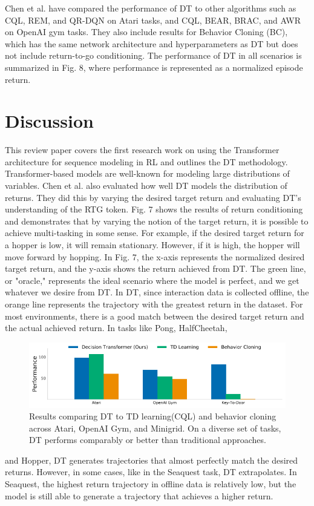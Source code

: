 \documentclass[conference]{IEEEtran}
\begin{document}
Chen et al.\cite{b1} have compared the performance of DT to other algorithms such as CQL\cite{b18}, REM\cite{b16}, and QR-DQN\cite{b19} on Atari tasks, and CQL\cite{b18}, BEAR\cite{b20}, BRAC\cite{b21}, and AWR\cite{b22} on OpenAI gym tasks. They also include results for Behavior Cloning (BC), which has the same network architecture and hyperparameters as DT but does not include return-to-go conditioning. The performance of DT in all scenarios is summarized in Fig. 8, where performance is represented as a normalized episode return.


\section{Discussion}
This review paper covers the first research work on using the Transformer architecture for sequence modeling in RL and outlines the DT methodology. Transformer-based models are well-known for modeling large distributions of variables. Chen et al.\cite{b1} also evaluated how well DT models the distribution of returns. They did this by varying the desired target return and evaluating DT's understanding of the RTG token. Fig. 7 shows the results of return conditioning and demonstrates that by varying the notion of the target return, it is possible to achieve multi-tasking in some sense. For example, if the desired target return for a hopper is low, it will remain stationary. However, if it is high, the hopper will move forward by hopping. In Fig. 7, the x-axis represents the normalized desired target return, and the y-axis shows the return achieved from DT. The green line, or "oracle," represents the ideal scenario where the model is perfect, and we get whatever we desire from DT. In DT, since interaction data is collected offline, the orange line represents the trajectory with the greatest return in the dataset. For most environments, there is a good match between the desired target return and the actual achieved return. In tasks like Pong, HalfCheetah, 
\begin{figure}[htbp]
\centerline{\includegraphics[scale=0.4]{Images/result_2.png}}
\caption{Results comparing DT to TD learning(CQL) and behavior cloning across Atari, OpenAI Gym, and Minigrid. On a diverse set of tasks, DT performs comparably or better than traditional approaches\cite{b1}.}
\label{fig}
\end{figure}
and Hopper, DT generates trajectories that almost perfectly match the desired returns. However, in some cases, like in the Seaquest task, DT extrapolates. In Seaquest, the highest return trajectory in offline data is relatively low, but the model is still able to generate a trajectory that achieves a higher return. 
\end{document}
